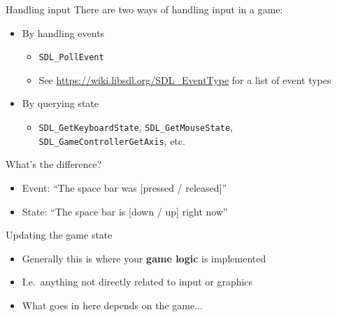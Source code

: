 \begin{frame}{Handling input}
    There are two ways of handling input in a game:
    \begin{itemize}
        \item By handling events
            \begin{itemize}
                \item \lstinline{SDL_PollEvent}
                \item See \url{https://wiki.libsdl.org/SDL_EventType} for a list of event types
            \end{itemize}
        \item By querying state
            \begin{itemize}
                \item \lstinline{SDL_GetKeyboardState}, \lstinline{SDL_GetMouseState},
                    \lstinline{SDL_GameControllerGetAxis}, etc.
            \end{itemize}
    \end{itemize}
    What's the difference?
    \begin{itemize}
        \item Event: ``The space bar was [pressed / released]''
        \item State: ``The space bar is [down / up] right now''
    \end{itemize}
\end{frame}

\begin{frame}{Updating the game state}
    \begin{itemize}
        \item Generally this is where your \textbf{game logic} is implemented
        \item I.e.\ anything not directly related to input or graphics
        \item What goes in here depends on the game...
    \end{itemize}
\end{frame}

